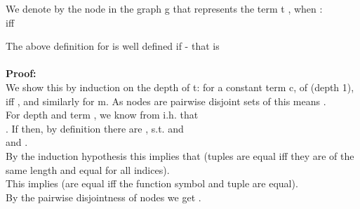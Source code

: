 We denote by  the node in the graph g that represents the term t , when :\\
 iff 
\begin{theorem}
The above definition for  is well defined if  - that is\\
\\
\textbf{Proof:}\\
We show this by induction on the depth of t: for a constant term c, of (depth 1), \\
 iff , and similarly for m. As nodes are pairwise disjoint sets of \gfas this means .\\
For depth  and term , we know from i.h. that \\
.
If  then, by definition there are , s.t.  and\\
 and
.\\
By the induction hypothesis this implies that  (tuples are equal iff they are of the same length and equal for all indices).\\
This implies  (\gfas are equal iff the function symbol and tuple are equal).\\
By the pairwise disjointness of nodes we get .\\
\QED
\end{theorem}

